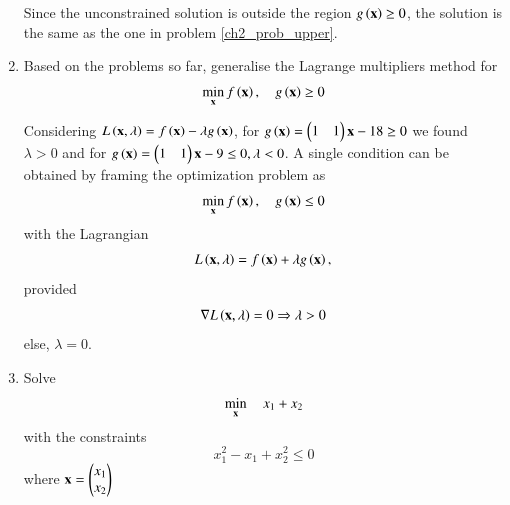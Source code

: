 \begin{enumerate}[label=\arabic*.,ref=\thesubsection.\theenumi]
%
\solution Since the unconstrained solution is outside the region $g\left(\mathbf{x}\right) \geq 0$, the solution is the same as the one in problem \ref{ch2_prob_upper}.
%
\item
Based on the problems so far, generalise the Lagrange multipliers method for 
%
	 \begin{align}
	 \label{ch2_lagrange_ineq}
	\min_{\mathbf{x}} f\left(\mathbf{x}\right) , \quad 
	 g\left(\mathbf{x}\right)  \geq 0 
	 \end{align}
%

%
\solution
Considering $L\left(\mathbf{x},\lambda\right) = f\left(\mathbf{x}\right) - \lambda g\left(\mathbf{x}\right)$, for $g\left(\mathbf{x}\right) = \begin{pmatrix}1 & 1\end{pmatrix}\mathbf{x} - 18 \geq 0$ we found $\lambda > 0 $ and for $g\left(\mathbf{x}\right) = \begin{pmatrix}1 & 1\end{pmatrix}\mathbf{x} - 9 \leq 0, \lambda < 0$. A single condition can be obtained by framing the optimization problem as
%
	 \begin{align}
	 \label{ch2_lagrange_ineq_summary}
	\min_{\mathbf{x}} f\left(\mathbf{x}\right) , \quad 
	 g\left(\mathbf{x}\right)  \leq 0 
	 \end{align}
%
with the Lagrangian
%
\begin{equation}
L\brak{\mbf{x},\lambda} = f\brak{\mbf{x}} + \lambda g\brak{\mbf{x}}, %
\end{equation}
%
provided
%
\begin{equation}
\label{ch2_kkt_necessary}
\nabla L\left(\mathbf{x},\lambda\right) = 0 \Rightarrow \lambda > 0
\end{equation}
else, $\lambda = 0$.

%
\item
	\label{convex_sdp_eqiv}
	Solve
	\begin{equation}
	\min_{\mathbf{x}} \quad x_1 + x_2
	\end{equation}
	with the constraints
	\begin{equation}
	x_1^2 - x_1 + x_2^2 \leq 0
	\end{equation}
where 
$
\mathbf{x} = \begin{pmatrix}
x_1 \\
x_2
\end{pmatrix}
$


\end{enumerate}
